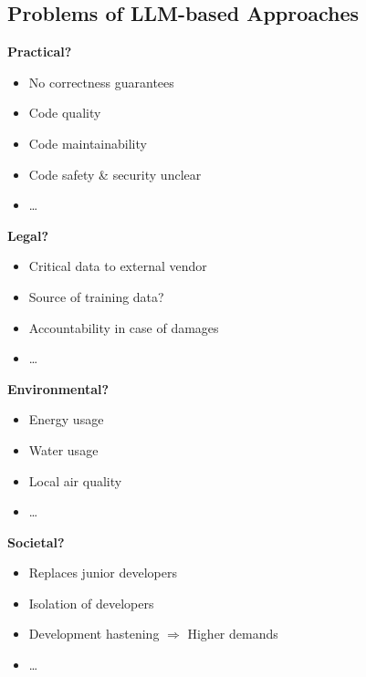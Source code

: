 \subsection{Problems of LLM-based Approaches}
\begin{frame}{\insertsubsection{}}
	\begin{fancycolumns}[animation=none, columns=4, t]
		\textbf{Practical?}
		\begin{itemize}
			\item No correctness guarantees 
			\item Code quality
			\item Code maintainability
			\item Code safety \& security unclear
			\item \dots
		\end{itemize}
		\nextcolumn
		\textbf{Legal?}
		\begin{itemize}
			\item Critical data to external vendor
			\item Source of training data?
			\item Accountability in case of damages
			\item \dots
		\end{itemize}
		\nextcolumn
		\textbf{Environmental?}
		\begin{itemize}
			\item Energy usage
			\item Water usage
			\item Local air quality
			\item \dots
		\end{itemize}
		\nextcolumn
		\textbf{Societal?}
		\begin{itemize}
			\item Replaces junior developers
			\item Isolation of developers
			\item Development hastening $\Rightarrow$ Higher demands
			\item \dots
		\end{itemize}
	\end{fancycolumns}
\end{frame}





